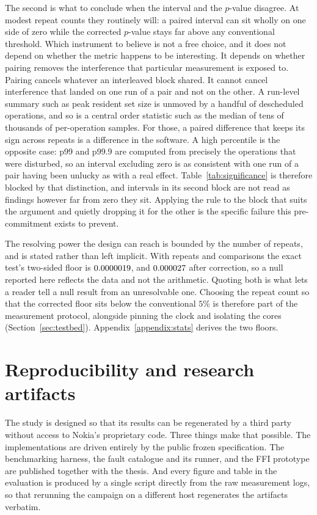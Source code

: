 \documentclass[english,oneside,a4paper,censored,csm,software-track-2020]{HYthesisML}
\begin{document}
The second is what to conclude when the interval and the $p$-value disagree. At modest repeat
counts they routinely will: a paired interval can sit wholly on one side of zero while the
corrected $p$-value stays far above any conventional threshold. Which instrument to believe
is not a free choice, and it does not depend on whether the metric happens to be interesting. It
depends on whether pairing removes the interference that particular measurement is exposed to.
Pairing cancels whatever an interleaved block shared. It cannot cancel interference that landed
on one run of a pair and not on the other. A run-level summary such as peak resident set size is
unmoved by a handful of descheduled operations, and so is a central order statistic such as the
median of tens of thousands of per-operation samples. For those, a paired difference that keeps
its sign across repeats is a difference in the software. A high percentile is the
opposite case: p99 and p99.9 are computed from precisely the operations that were disturbed, so
an interval excluding zero is as consistent with one run of a pair having been unlucky as with a
real effect. Table~\ref{tab:significance} is therefore blocked by that distinction, and
intervals in its second block are not read as findings however far from zero they sit. Applying
the rule to the block that suits the argument and quietly dropping it for the other is the
specific failure this pre-commitment exists to prevent.

The resolving power the design can reach is bounded by the number of repeats, and is stated
rather than left implicit. With \NRepeats{} repeats and \NTests{} comparisons the exact test's
two-sided floor is $0.0000019$, and $0.000027$ after correction, so a null reported
here reflects the data and not the arithmetic. Quoting both is what lets a reader tell a null
result from an unresolvable one. Choosing the repeat count so that the corrected floor sits below
the conventional $5\%$ is therefore part of the measurement protocol, alongside pinning the clock
and isolating the cores (Section~\ref{sec:testbed}). Appendix~\ref{appendix:stats} derives the two
floors.

\section{Reproducibility and research artifacts}\label{sec:repro}
The study is designed so that its results can be regenerated by a third party without access to
Nokia's proprietary code. Three things make that possible. The implementations are driven
entirely by the public frozen specification. The benchmarking harness, the fault catalogue and
its runner, and the FFI prototype are published together with the thesis. And every figure and
table in the evaluation is produced by a single script directly from the raw measurement logs,
so that rerunning the campaign on a different host regenerates the artifacts verbatim.
\end{document}
